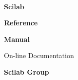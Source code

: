 \documentclass{slides}
\begin{document}
\pagestyle{empty}
\begin{slide}

\ 

{\bf\Huge Scilab}

{\bf\Huge Reference}

{\bf\Huge Manual}

\vspace{2cm}

\Large On-line Documentation

\vspace{2cm}

{\Large\bf Scilab Group}

\end{slide}
\end{document}
